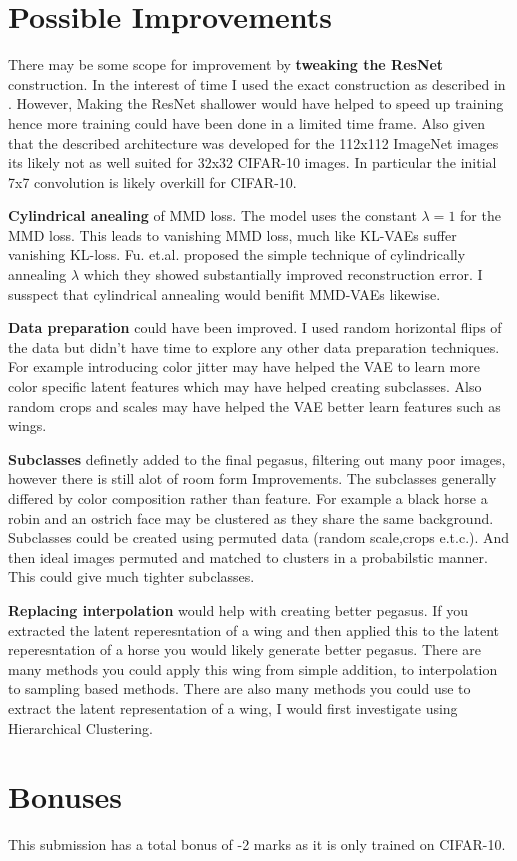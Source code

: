 \documentclass{article}
\begin{document}
\section{Possible Improvements}
There may be some scope for improvement by \textbf{tweaking the ResNet} construction. In the interest of time I used the exact construction as described in \cite{ResNet}. However, Making the ResNet shallower would have helped to speed up training hence more training could have been done in a limited time frame. Also given that the described architecture was developed for the 112x112 ImageNet images its likely not as well suited for 32x32 CIFAR-10 images. In particular the initial 7x7 convolution is likely overkill for CIFAR-10.

\textbf{Cylindrical anealing} of MMD loss. The model uses the constant $\lambda=1$ for the MMD loss. This leads to vanishing MMD loss, much like KL-VAEs suffer vanishing KL-loss. Fu. et.al. \cite{cylindricalAnnealing} proposed the simple technique of cylindrically annealing $\lambda$ which they showed substantially improved reconstruction error. I susspect that cylindrical annealing would benifit MMD-VAEs likewise.

\textbf{Data preparation} could have been improved. I used random horizontal flips of the data but didn't have time to explore any other data preparation techniques. For example introducing color jitter may have helped the VAE to learn more color specific latent features which may have helped creating subclasses. Also random crops and scales may have helped the VAE better learn features such as wings.   

\textbf{Subclasses} definetly added to the final pegasus, filtering out many poor images, however there is still alot of room form Improvements. The subclasses generally differed by color composition rather than feature. For example a black horse a robin and an ostrich face may be clustered as they share the same background. Subclasses could be created using permuted data (random scale,crops e.t.c.). And then ideal images permuted and matched to clusters in a probabilstic manner. This could give much tighter subclasses.

\textbf{Replacing interpolation} would help with creating better pegasus. If you extracted the latent reperesntation of a wing and then applied this to the latent reperesntation of a horse you would likely generate better pegasus. There are many methods you could apply this wing from simple addition, to interpolation to sampling based methods. There are also many methods you could use to extract the latent representation of a wing, I would first investigate using Hierarchical Clustering.


\section*{Bonuses}
This submission has a total bonus of -2 marks as it is only trained on CIFAR-10.

\printbibliography
\end{document}
